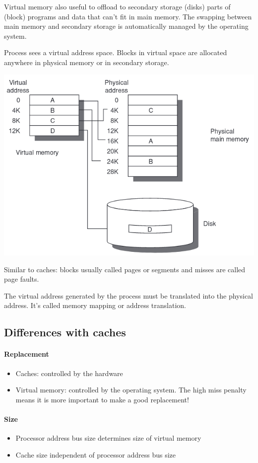 Virtual memory also useful to offload to secondary storage (disks) parts of (block) programs and data that can’t fit in main memory. The swapping between main memory and secondary storage is automatically managed by the operating system.

Process sees a virtual address space. 
Blocks in virtual space are allocated anywhere in physical memory or in secondary storage.

\includegraphics[width=\textwidth]{images/virtual_memory_scheme.png}

Similar to caches: 
blocks usually called pages or segments
and misses are called page faults.

The virtual address generated by the process must be translated into the physical address. It's called memory mapping or address translation.

\subsection{Differences with caches}
\paragraph{Replacement}
\begin{itemize}
    \item Caches: controlled by the hardware
    \item Virtual memory: controlled by the operating system. The high miss penalty means it is more important to make a good replacement!
\end{itemize}

\paragraph{Size}
\begin{itemize}
    \item Processor address bus size determines size of virtual memory
    \item Cache size independent of processor address bus size
\end{itemize}

